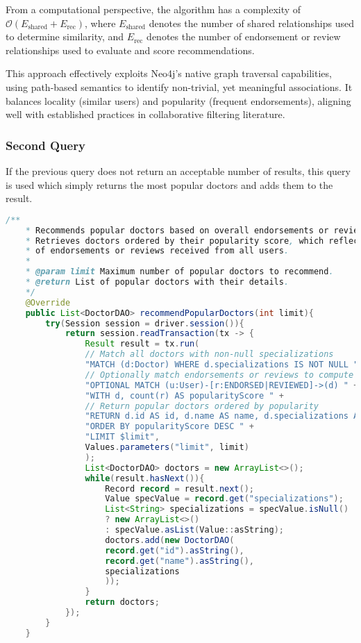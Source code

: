 From a computational perspective, the algorithm has a complexity of $\mathcal{O}(E_{\text{shared}} + E_{\text{rec}})$, where $E_{\text{shared}}$ denotes the number of shared relationships used to determine similarity, and $E_{\text{rec}}$ denotes the number of endorsement or review relationships used to evaluate and score recommendations.

This approach effectively exploits Neo4j's native graph traversal capabilities, using path-based semantics to identify non-trivial, yet meaningful associations. It balances locality (similar users) and popularity (frequent endorsements), aligning well with established practices in collaborative filtering literature.

\subsubsection{Second Query}
If the previous query does not return an acceptable number of results, this query is used which simply returns the most popular doctors and adds them to the result.

\begin{lstlisting}[language=java]
	/**
	* Recommends popular doctors based on overall endorsements or reviews.
	* Retrieves doctors ordered by their popularity score, which reflects the total number
	* of endorsements or reviews received from all users.
	*
	* @param limit Maximum number of popular doctors to recommend.
	* @return List of popular doctors with their details.
	*/
	@Override
	public List<DoctorDAO> recommendPopularDoctors(int limit){
		try(Session session = driver.session()){
			return session.readTransaction(tx -> {
				Result result = tx.run(
				// Match all doctors with non-null specializations
				"MATCH (d:Doctor) WHERE d.specializations IS NOT NULL " +
				// Optionally match endorsements or reviews to compute popularity
				"OPTIONAL MATCH (u:User)-[r:ENDORSED|REVIEWED]->(d) " +
				"WITH d, count(r) AS popularityScore " +
				// Return popular doctors ordered by popularity
				"RETURN d.id AS id, d.name AS name, d.specializations AS specializations " +
				"ORDER BY popularityScore DESC " +
				"LIMIT $limit",
				Values.parameters("limit", limit)
				);
				List<DoctorDAO> doctors = new ArrayList<>();
				while(result.hasNext()){
					Record record = result.next();
					Value specValue = record.get("specializations");
					List<String> specializations = specValue.isNull()
					? new ArrayList<>()
					: specValue.asList(Value::asString);
					doctors.add(new DoctorDAO(
					record.get("id").asString(),
					record.get("name").asString(),
					specializations
					));
				}
				return doctors;
			});
		}
	}
\end{lstlisting}

